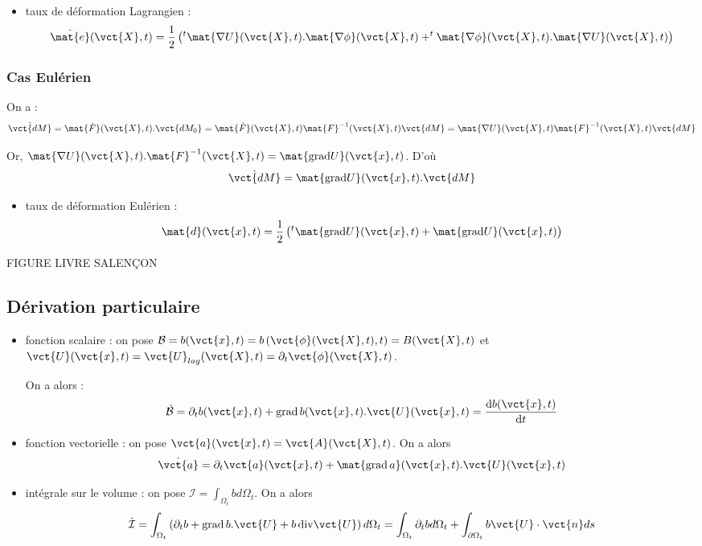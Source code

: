 \documentclass[11pt,a4paper]{article}
\begin{document}
\begin{itemize}
	\item taux de déformation Lagrangien :
	\[\dot{\mat{e}}(\vct{X},t)=\frac{1}{2}\left(^t\mat{\nabla U}(\vct{X},t).\mat{\nabla\phi}(\vct{X},t)+^t\mat{\nabla \phi}(\vct{X},t).\mat{\nabla U}(\vct{X},t)\right)\]
\end{itemize}

\subsubsection{Cas Eulérien}
On a :
\[\dot{\vct{dM}}=\mat{\dot{F}}(\vct{X},t).\vct{dM_0}=\mat{\dot{F}}(\vct{X},t)\mat{F}^{-1}(\vct{X},t)\vct{dM}=\mat{\nabla U}(\vct{X},t)\mat{F}^{-1}(\vct{X},t)\vct{dM}\]

Or, $\mat{\nabla U}(\vct{X},t).\mat{F}^{-1}(\vct{X},t)=\mat{\textrm{grad}U}(\vct{x},t)$. D'où
\[\dot{\vct{dM}}=\mat{\textrm{grad}U}(\vct{x},t).\vct{dM}\]

\begin{itemize}
	\item taux de déformation Eulérien :
	\[\mat{d}(\vct{x},t)=\frac{1}{2}\left(^t\mat{\textrm{grad} U}(\vct{x},t)+\mat{\textrm{grad} U}(\vct{x},t)\right)\]
\end{itemize}


FIGURE LIVRE SALENÇON

\subsection{Dérivation particulaire}
\begin{itemize}
	\item fonction scalaire : on pose $\mathcal{B}=b(\vct{x},t)=b\left(\vct{\phi}(\vct{X},t),t\right)=B(\vct{X},t)$ et $\vct{U}(\vct{x},t)=\vct{U}_{lag}(\vct{X},t)=\partial_t\vct{\phi}(\vct{X},t)$.
	
	On a alors :
	\begin{equation*}
	\dot{\mathcal{B}}=\partial_t b(\vct{x},t)+\textrm{grad}\,b(\vct{x},t).\vct{U}(\vct{x},t)=\frac{\textrm{d}b(\vct{x},t)}{\textrm{d}t}
	\end{equation*}

	\item fonction vectorielle : on pose $\vct{a}(\vct{x},t)=\vct{A}(\vct{X},t)$. On a alors 
	\begin{equation*}
	\dot{\vct{a}}=\partial_t \vct{a}(\vct{x},t)+\mat{\textrm{grad}\,a}(\vct{x},t).\vct{U}(\vct{x},t)
	\end{equation*}
	
	\item intégrale sur le volume : on pose $\mathcal{I}=\int_{\Omega_t}bd\Omega_t$. On a alors 
	\begin{equation*}
	\dot{\mathcal{I}}=\int_{\Omega_t}\left(\partial_tb+\textrm{grad}\,b.\vct{U}+b\,\textrm{div}\vct{U}\right)d\Omega_t=\int_{\Omega_t} \partial_tb d\Omega_t+\int_{\partial\Omega_t}b\vct{U}\cdot\vct{n}ds
	\end{equation*}
	
\end{itemize}
\end{document}

